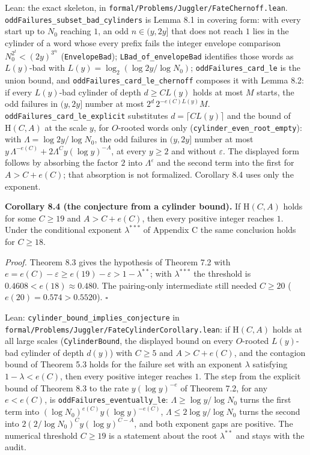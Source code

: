 \documentclass[11pt,a4paper]{article}
\begin{document}
Lean: the exact skeleton, in
\texttt{\nolinkurl{formal/Problems/Juggler/FateChernoff.lean}}.
\texttt{\nolinkurl{oddFailures_subset_bad_cylinders}} is Lemma 8.1 in
covering form: with every start up to \(N_0\) reaching \(1\), an odd
\(n\in(y,2y]\) that does not reach \(1\) lies in the cylinder of a word
whose every prefix fails the integer envelope comparison
\(N_0^{2^t}<(2y)^{3^{o_t}}\) (\texttt{\nolinkurl{EnvelopeBad}});
\texttt{\nolinkurl{LBad_of_envelopeBad}} identifies those words as
\(L(y)\)-bad with \(L(y)=\log_2(\log 2y/\log N_0)\);
\texttt{\nolinkurl{oddFailures_card_le}} is the union bound, and
\texttt{\nolinkurl{oddFailures_card_le_chernoff}} composes it with Lemma
8.2: if every \(L(y)\)-bad cylinder of depth \(d\ge CL(y)\) holds at
most \(M\) starts, the odd failures in \((y,2y]\) number at most
\(2^d\,2^{-e(C)L(y)}M\).
\texttt{\nolinkurl{oddFailures_card_le_explicit}} substitutes
\(d=\lceil CL(y)\rceil\) and the bound of \(\mathrm H(C,A)\) at the
scale \(y\), for \(O\)-rooted words only
(\texttt{\nolinkurl{cylinder_even_root_empty}}): with
\(\Lambda=\log 2y/\log N_0\), the odd failures in \((y,2y]\) number at
most \(y\,\Lambda^{-e(C)}+2\Lambda^{C}y(\log y)^{-A}\), at every
\(y\ge 2\) and without \(\varepsilon\). The displayed form follows by
absorbing the factor \(2\) into \(\Lambda^{\varepsilon}\) and the second
term into the first for \(A>C+e(C)\); that absorption is not formalized.
Corollary 8.4 uses only the exponent.

\textbf{Corollary 8.4 (the conjecture from a cylinder bound).} If
\(\mathrm H(C,A)\) holds for some \(C\ge 19\) and \(A>C+e(C)\), then
every positive integer reaches \(1\). Under the conditional exponent
\(\lambda^{***}\) of Appendix C the same conclusion holds for
\(C\ge 18\).

\emph{Proof.} Theorem 8.3 gives the hypothesis of Theorem 7.2 with
\(e=e(C)-\varepsilon\ge e(19)-\varepsilon>1-\lambda^{**}\); with
\(\lambda^{***}\) the threshold is \(0.4608<e(18)\approx0.480\). The
pairing-only intermediate still needed \(C\ge 20\)
(\(e(20)=0.574>0.5520\)). \(\square\)

Lean: \texttt{\nolinkurl{cylinder_bound_implies_conjecture}} in
\texttt{\nolinkurl{formal/Problems/Juggler/FateCylinderCorollary.lean}}:
if \(\mathrm H(C,A)\) holds at all large scales
(\texttt{\nolinkurl{CylinderBound}}, the displayed bound on every
\(O\)-rooted \(L(y)\)-bad cylinder of depth \(d(y)\)) with \(C\ge 5\)
and \(A>C+e(C)\), and the contagion bound of Theorem 5.3 holds for the
failure set with an exponent \(\lambda\) satisfying \(1-\lambda<e(C)\),
then every positive integer reaches \(1\). The step from the explicit
bound of Theorem 8.3 to the rate \(y(\log y)^{-e}\) of Theorem 7.2, for
any \(e<e(C)\), is \texttt{\nolinkurl{oddFailures_eventually_le}}:
\(\Lambda\ge\log y/\log N_0\) turns the first term into
\((\log N_0)^{e(C)}y(\log y)^{-e(C)}\), \(\Lambda\le 2\log y/\log N_0\)
turns the second into \(2(2/\log N_0)^Cy(\log y)^{C-A}\), and both
exponent gaps are positive. The numerical threshold \(C\ge 19\) is a
statement about the root \(\lambda^{**}\) and stays with the audit.
\end{document}
